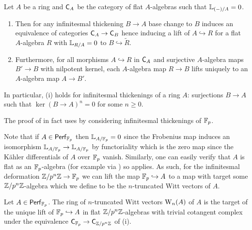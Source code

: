 \begin{theorem}\label{thm: main result of deformation theory}
    Let $A$ be a ring and $\mathsf{C}_{A}$ be the category of flat $A$-algebras such that $\mathbb{L}_{(-)/A}=0$.
    \begin{enumerate}[label=(\roman*)]
        \item Then for any infinitesmal thickening $B\to A$ base change to $B$ induces an equivalence of categories $\mathsf{C}_{A}\to\mathsf{C}_{B}$ hence inducing a lift of $A\hookrightarrow R$ for a flat $A$-algebra $R$ with $\mathbb{L}_{R/A}=0$ to $B\hookrightarrow\widetilde{R}$. 
        \item Furthermore, for all morphisms $A\hookrightarrow R$ in $\mathsf{C}_{A}$ and surjective $A$-algebra maps $B'\to B$ with nilpotent kernel, each $A$-algebra map $R\to B$ lifts uniquely to an $A$-algebra map $A\to B'$.
    \end{enumerate}
\end{theorem}
\begin{remark}
    In particular,  (i) holds for infinitesmal thickenings of a ring $A$: surjections $B\to A$ such that $\ker(B\to A)^{n}=0$ for some $n\geq0$. 
\end{remark}
\begin{remark}
    The proof of  in fact uses  by considering infinitesmal thickenings of $\mathbb{F}_{p}$. 
\end{remark}
Note that if $A\in\mathsf{Perf}_{\mathbb{F}_{p}}$ then $\mathbb{L}_{A/\mathbb{F}_{p}}=0$ since the Frobenius map induces an isomorphism $\mathbb{L}_{A/\mathbb{F}_{p}}\to\mathbb{L}_{A/\mathbb{F}_{p}}$ by functoriality which is the zero map since the K\"{a}hler differentials of $A$ over $\mathbb{F}_{p}$ vanish. Similarly, one can easily verify that $A$ is flat as an $\mathbb{F}_{p}$-algebra (for example via \cite[\href{https://stacks.math.columbia.edu/tag/00HD}{Tag 00HD (3)}]{stacks-project}) so applies. As such, for the infinitesmal deformation $\mathbb{Z}/p^{n}\mathbb{Z}\to\mathbb{F}_{p}$ we can lift the map $\mathbb{F}_{p}\hookrightarrow A$ to a map with target some $\mathbb{Z}/p^{n}\mathbb{Z}$-algebra which we define to be the $n$-truncated Witt vectors of $A$. 
\begin{definition}\label{def: n-truncated Witt vectors}
    Let $A\in\mathsf{Perf}_{\mathbb{F}_{p}}$. The ring of $n$-truncated Witt vectors $\mathrm{W}_{n}(A)$ of $A$ is the target of the unique lift of $\mathbb{F}_{p}\hookrightarrow A$ in flat $\mathbb{Z}/p^{n}\mathbb{Z}$-algebras with trivial cotangent complex under the equivalence $\mathsf{C}_{\mathbb{F}_{p}}\to\mathsf{C}_{\mathbb{Z}/p^{n}\mathbb{Z}}$ of  (i). 
\end{definition}
